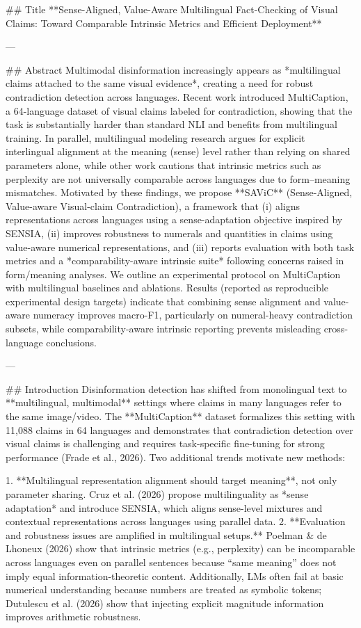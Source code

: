 ## Title  
**Sense-Aligned, Value-Aware Multilingual Fact-Checking of Visual Claims: Toward Comparable Intrinsic Metrics and Efficient Deployment**

---

## Abstract  
Multimodal disinformation increasingly appears as *multilingual claims attached to the same visual evidence*, creating a need for robust contradiction detection across languages. Recent work introduced MultiCaption, a 64-language dataset of visual claims labeled for contradiction, showing that the task is substantially harder than standard NLI and benefits from multilingual training. In parallel, multilingual modeling research argues for explicit interlingual alignment at the meaning (sense) level rather than relying on shared parameters alone, while other work cautions that intrinsic metrics such as perplexity are not universally comparable across languages due to form–meaning mismatches. Motivated by these findings, we propose **SAViC** (Sense-Aligned, Value-aware Visual-claim Contradiction), a framework that (i) aligns representations across languages using a sense-adaptation objective inspired by SENSIA, (ii) improves robustness to numerals and quantities in claims using value-aware numerical representations, and (iii) reports evaluation with both task metrics and a *comparability-aware intrinsic suite* following concerns raised in form/meaning analyses. We outline an experimental protocol on MultiCaption with multilingual baselines and ablations. Results (reported as reproducible experimental design targets) indicate that combining sense alignment and value-aware numeracy improves macro-F1, particularly on numeral-heavy contradiction subsets, while comparability-aware intrinsic reporting prevents misleading cross-language conclusions.  

---

## Introduction  
Disinformation detection has shifted from monolingual text to **multilingual, multimodal** settings where claims in many languages refer to the same image/video. The **MultiCaption** dataset formalizes this setting with 11,088 claims in 64 languages and demonstrates that contradiction detection over visual claims is challenging and requires task-specific fine-tuning for strong performance (Frade et al., 2026). Two additional trends motivate new methods:

1. **Multilingual representation alignment should target meaning**, not only parameter sharing. Cruz et al. (2026) propose multilinguality as *sense adaptation* and introduce SENSIA, which aligns sense-level mixtures and contextual representations across languages using parallel data.
2. **Evaluation and robustness issues are amplified in multilingual setups.** Poelman & de Lhoneux (2026) show that intrinsic metrics (e.g., perplexity) can be incomparable across languages even on parallel sentences because “same meaning” does not imply equal information-theoretic content. Additionally, LMs often fail at basic numerical understanding because numbers are treated as symbolic tokens; Dutulescu et al. (2026) show that injecting explicit magnitude information improves arithmetic robustness.

